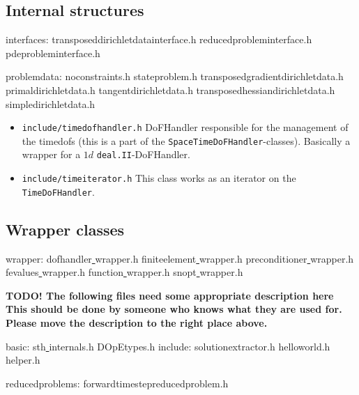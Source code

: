 \subsection{Internal structures}
interfaces:
transposeddirichletdatainterface.h
reducedprobleminterface.h
            pdeprobleminterface.h  

problemdata:
noconstraints.h        stateproblem.h          transposedgradientdirichletdata.h
primaldirichletdata.h  tangentdirichletdata.h  transposedhessiandirichletdata.h
simpledirichletdata.h
\begin{itemize}
\item \texttt{include/timedofhandler.h} DoFHandler responsible for the management of the timedofs (this is a part of the \texttt{SpaceTimeDoFHandler}-classes). Basically a wrapper for a $1d$ \texttt{deal.II}-DoFHandler.
\item \texttt{include/timeiterator.h} This class works as an iterator on the \texttt{TimeDoFHandler}.                 
\end{itemize}
\subsection{Wrapper classes}

wrapper:
dofhandler\underline{ }wrapper.h  finiteelement\underline{ }wrapper.h  preconditioner\underline{ }wrapper.h
fevalues\underline{ }wrapper.h    function\underline{ }wrapper.h       snopt\underline{ }wrapper.h

{\bf TODO! The following files need some appropriate description here 
This should be done by someone who knows what they are used for. Please move the description to the right place above.}

basic:
      sth\underline{ }internals.h                     
      DOpEtypes.h 
include:   
solutionextractor.h                 
            helloworld.h                               
            helper.h                                          

reducedproblems:
 forwardtimestepreducedproblem.h
  


